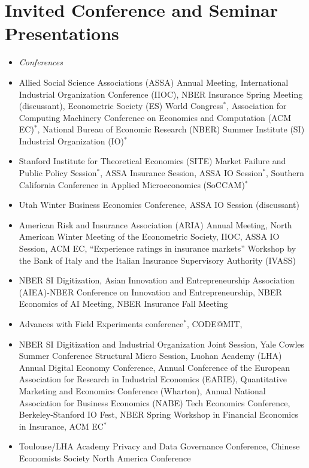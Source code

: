 \section*{Invited Conference and Seminar Presentations}
\begin{itemize}
\item \textit{Conferences}
\item[2025-2026] Allied Social Science Associations (ASSA) Annual Meeting, International Industrial Organization Conference (IIOC), NBER Insurance Spring Meeting (discussant), Econometric Society (ES) World Congress$^{*}$, Association for Computing Machinery Conference on Economics and Computation (ACM EC)$^{*}$, National Bureau of Economic Research (NBER) Summer Institute (SI) Industrial Organization (IO)$^{*}$
\item[2024-2025] Stanford Institute for Theoretical Economics (SITE) Market Failure and Public Policy Session$^{*}$, ASSA Insurance Session, ASSA IO Session$^{*}$, Southern California Conference in Applied Microeconomics (SoCCAM)$^{*}$
\item[2023-2024] Utah Winter Business Economics Conference, ASSA IO Session (discussant)
\item[2022-2023] American Risk and Insurance Association (ARIA) Annual Meeting, North American Winter Meeting of the Econometric Society, IIOC, ASSA IO Session, ACM EC, ``Experience ratings in insurance markets'' Workshop by the Bank of Italy and the Italian Insurance Supervisory Authority (IVASS)
\item[2021-2022] NBER SI Digitization,  Asian Innovation and Entrepreneurship Association (AIEA)-NBER Conference on Innovation and Entrepreneurship, NBER Economics of AI Meeting, NBER Insurance Fall Meeting
\item[2020-2021] Advances with Field Experiments conference$^{*}$, CODE@MIT, 
\item[2019-2020]
  NBER SI Digitization and Industrial Organization Joint Session, Yale Cowles Summer Conference Structural Micro Session, Luohan Academy (LHA) Annual Digital Economy Conference, Annual Conference of the European Association for Research in Industrial Economics (EARIE), Quantitative Marketing and Economics Conference (Wharton), Annual National Association for Business Economics (NABE) Tech Economics Conference, Berkeley-Stanford IO Fest, NBER Spring Workshop in Financial Economics in Insurance, ACM EC$^{*}$
\item[2018-2019] Toulouse/LHA Academy Privacy and Data Governance Conference, Chinese Economists Society North America Conference

\end{itemize}
